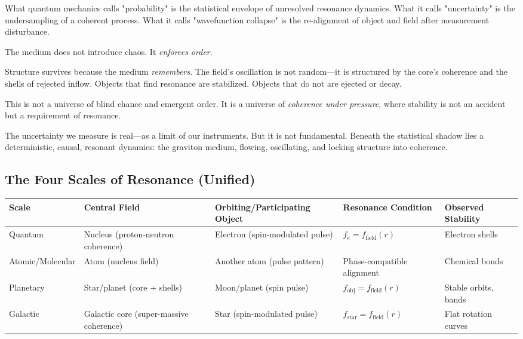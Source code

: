 \documentclass[12pt, a4paper]{article}
\begin{document}
What quantum mechanics calls "probability" is the statistical envelope of unresolved resonance dynamics. What it calls "uncertainty" is the undersampling of a coherent process. What it calls "wavefunction collapse" is the re-alignment of object and field after measurement disturbance.

The medium does not introduce chaos. It \textit{enforces order}.

Structure survives because the medium \textit{remembers}. The field's oscillation is not random—it is structured by the core's coherence and the shells of rejected inflow. Objects that find resonance are stabilized. Objects that do not are ejected or decay.

This is not a universe of blind chance and emergent order. It is a universe of \textit{coherence under pressure}, where stability is not an accident but a requirement of resonance.

The uncertainty we measure is real—as a limit of our instruments. But it is not fundamental. Beneath the statistical shadow lies a deterministic, causal, resonant dynamics: the graviton medium, flowing, oscillating, and locking structure into coherence.

\subsection{The Four Scales of Resonance (Unified)}
\label{subsec:four_scales}

\begin{table}[h]
\centering
\small
\begin{tabular}{|l|l|l|l|l|}
\hline
\textbf{Scale} & \textbf{Central Field} & \textbf{Orbiting/Participating Object} & \textbf{Resonance Condition} & \textbf{Observed Stability} \\
\hline
Quantum & Nucleus (proton-neutron coherence) & Electron (spin-modulated pulse) & \( f_e = f_{\text{field}}(r) \) & Electron shells \\
\hline
Atomic/Molecular & Atom (nucleus field) & Another atom (pulse pattern) & Phase-compatible alignment & Chemical bonds \\
\hline
Planetary & Star/planet (core + shells) & Moon/planet (spin pulse) & \( f_{\text{obj}} = f_{\text{field}}(r) \) & Stable orbits, bands \\
\hline
Galactic & Galactic core (super-massive coherence) & Star (spin-modulated pulse) & \( f_{\text{star}} = f_{\text{field}}(r) \) & Flat rotation curves \\
\hline
\end{tabular}
\end{table}
\end{document}
